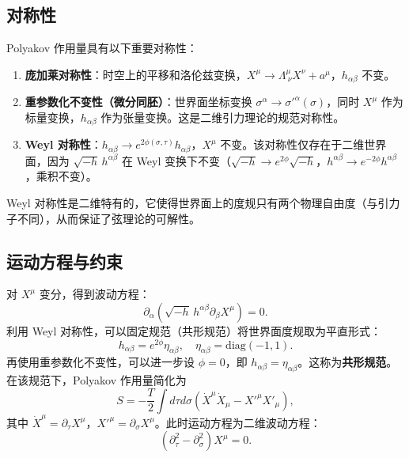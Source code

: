 \subsection*{对称性}

Polyakov 作用量具有以下重要对称性：

\begin{enumerate}
    \item \textbf{庞加莱对称性}：时空上的平移和洛伦兹变换，$X^\mu \to \Lambda^\mu_{\ \nu} X^\nu + a^\mu$，$h_{\alpha\beta}$ 不变。
    \item \textbf{重参数化不变性（微分同胚）}：世界面坐标变换 $\sigma^\alpha \to \sigma'^\alpha(\sigma)$，同时 $X^\mu$ 作为标量变换，$h_{\alpha\beta}$ 作为张量变换。这是二维引力理论的规范对称性。
    \item \textbf{Weyl 对称性}：$h_{\alpha\beta} \to e^{2\phi(\sigma,\tau)} h_{\alpha\beta}$，$X^\mu$ 不变。该对称性仅存在于二维世界面，因为 $\sqrt{-h}\, h^{\alpha\beta}$ 在 Weyl 变换下不变（$\sqrt{-h}\to e^{2\phi}\sqrt{-h}$，$h^{\alpha\beta}\to e^{-2\phi}h^{\alpha\beta}$，乘积不变）。
\end{enumerate}

Weyl 对称性是二维特有的，它使得世界面上的度规只有两个物理自由度（与引力子不同），从而保证了弦理论的可解性。

\subsection*{运动方程与约束}

对 $X^\mu$ 变分，得到波动方程：
\begin{equation}
\partial_\alpha \left( \sqrt{-h}\, h^{\alpha\beta} \partial_\beta X^\mu \right) = 0.
\end{equation}
利用 Weyl 对称性，可以固定规范（共形规范）将世界面度规取为平直形式：
\begin{equation}
h_{\alpha\beta} = e^{2\phi} \eta_{\alpha\beta}, \quad \eta_{\alpha\beta} = \mathrm{diag}(-1,1).
\end{equation}
再使用重参数化不变性，可以进一步设 $\phi=0$，即 $h_{\alpha\beta} = \eta_{\alpha\beta}$。这称为\textbf{共形规范}。在该规范下，Polyakov 作用量简化为
\begin{equation}
S = -\frac{T}{2} \int d\tau d\sigma \left( \dot{X}^\mu \dot{X}_\mu - X'^\mu X'_\mu \right),
\end{equation}
其中 $\dot{X}^\mu = \partial_\tau X^\mu$，$X'^\mu = \partial_\sigma X^\mu$。此时运动方程为二维波动方程：
\begin{equation}
\left( \partial_\tau^2 - \partial_\sigma^2 \right) X^\mu = 0.
\end{equation}


